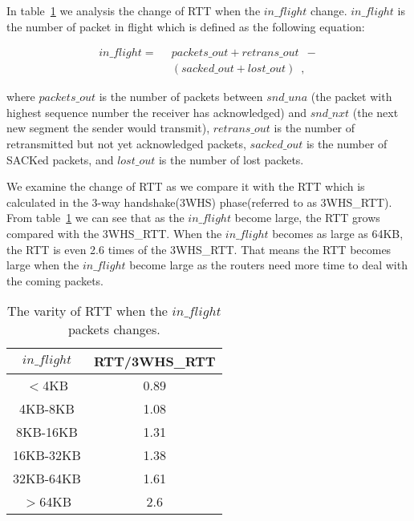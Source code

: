 In table~\ref{tbl:inflight-rtt} we analysis the change of RTT when the $in\_flight$ change. $in\_flight$ is the number of packet in flight which is defined as the following equation:

\begin{footnotesize}
 \begin{equation}
\label{eq:conserve}
\begin{aligned}
in\_flight = \enspace & packets\_out + retrans\_out \enspace - \\
& (sacked\_out + lost\_out) \enspace ,
\end{aligned}
\end{equation}
\end{footnotesize}

where $packets\_out$ is the number of packets between $snd\_una$ (the packet with highest sequence number the receiver has acknowledged) and $snd\_nxt$ (the next new segment the sender would transmit), $retrans\_out$ is the number of retransmitted but not yet acknowledged packets, $sacked\_out$ is the number of SACKed packets, and $lost\_out$ is the number of lost packets.

We examine the change of RTT as we compare it with the RTT which is calculated in the 3-way handshake(3WHS) phase(referred to as 3WHS\_RTT). From table~\ref{tbl:inflight-rtt} we can see that as the $in\_flight$ become large, the RTT grows compared with the 3WHS\_RTT. When the $in\_flight$ becomes as large as 64KB, the RTT is even 2.6 times of the 3WHS\_RTT. That means the RTT becomes large when the $in\_flight$ become large as the routers need more time to deal with the coming packets.      

\begin{table}[ht]
\tablefontsize
\renewcommand{\arraystretch}{\assize}
 \setlength{\tabcolsep}{3pt}
\caption{The varity of RTT when the $in\_flight$ packets changes.}
\centering
\begin{tabular}{c|c}
	\toprule
	 $in\_flight$ & RTT/3WHS\_RTT \\
	\hline
	$<$4KB & 0.89 \\
	\hline
	4KB-8KB & 1.08  \\
	\hline
	8KB-16KB & 1.31  \\
	\hline
	16KB-32KB & 1.38  \\
	\hline
	32KB-64KB & 1.61 \\
	\hline
	$>$64KB & 2.6  \\
	\bottomrule
\end{tabular}
\label{tbl:inflight-rtt}
\termspace
\end{table}  



